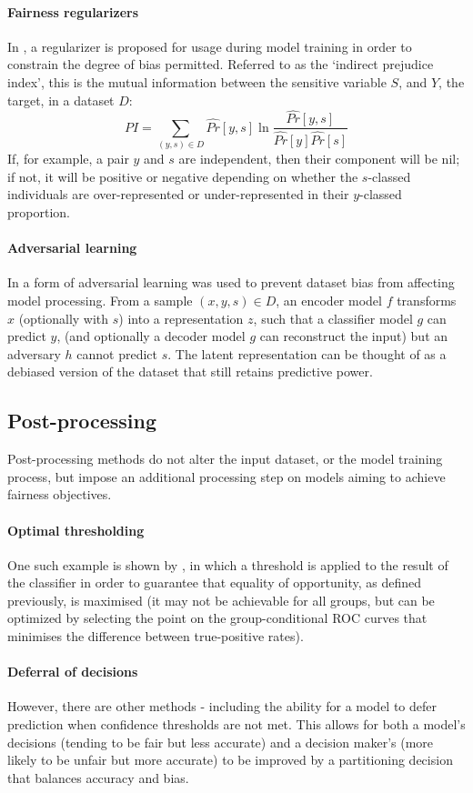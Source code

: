 \documentclass[conference]{IEEEtran}
\begin{document}
\paragraph{Fairness regularizers}In \cite{inproceedings}, a regularizer is proposed for usage during model training in order to constrain the degree of bias permitted. Referred to as the `indirect prejudice index', this is the mutual information between the sensitive variable $S$, and $Y$, the target, in a dataset $D$: \[PI = \sum_{(y, s) \in D} \hat{Pr}[y, s] \ln \frac{\hat{Pr}[y, s]}{\hat{Pr}[y]\hat{Pr}[s]}\] If, for example, a pair $y$ and $s$ are independent, then their component will be nil; if not, it will be positive or negative depending on whether the $s$-classed individuals are over-represented or under-represented in their $y$-classed proportion.
\paragraph{Adversarial learning} In \cite{DBLP:journals/corr/abs-1802-06309} a form of adversarial learning was used to prevent dataset bias from affecting model processing. From a sample $(x, y, s) \in D$, an encoder model $f$ transforms $x$ (optionally with $s$) into a representation $z$, such that a classifier model $g$ can predict $y$, (and optionally a decoder model $g$ can reconstruct the input) but an adversary $h$ cannot predict $s$. The latent representation can be thought of as a debiased version of the dataset that still retains predictive power.
\subsection{Post-processing}
Post-processing methods do not alter the input dataset, or the model training process, but impose an additional processing step on models aiming to achieve fairness objectives. 
\paragraph{Optimal thresholding}
One such example is shown by \cite{DBLP:journals/corr/HardtPS16}, in which a threshold is applied to the result of the classifier in order to guarantee that equality of opportunity, as defined previously, is maximised (it may not be achievable for all groups, but can be optimized by selecting the point on the group-conditional ROC curves that minimises the difference between true-positive rates). 

\paragraph{Deferral of decisions}
However, there are other methods - including the ability for a model to defer prediction when confidence thresholds are not met\cite{Madras2018PredictRI}. This allows for both a model's decisions (tending to be fair but less accurate) and a decision maker's (more likely to be unfair but more accurate) to be improved by a partitioning decision that balances accuracy and bias.
\end{document}
